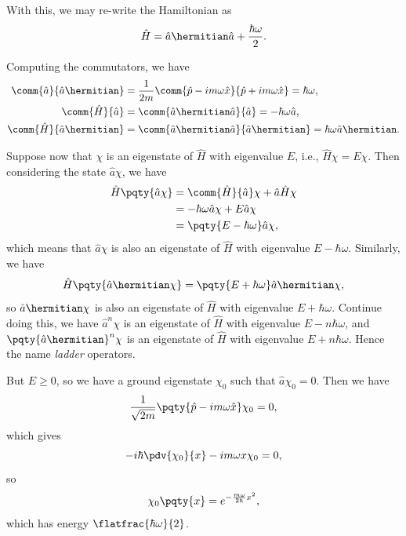 With this, we may re-write the Hamiltonian as
\begin{equation}
    \hat{H} = \hat{a}\hermitian \hat{a} + \frac{\hbar \omega}{2}.
\end{equation}

Computing the commutators, we have
\begin{subequations}
    \begin{align}
        \comm{\hat{a}}{\hat{a}\hermitian} &= \frac{1}{2m} \comm{\hat{p} - i m \omega \hat{x}}{\hat{p} + i m \omega \hat{x}}  = \hbar \omega, \\
        \comm{\hat{H}}{\hat{a}} &= \comm{\hat{a}\hermitian \hat{a}}{\hat{a}} = - \hbar \omega \hat{a}, \\
        \comm{\hat{H}}{\hat{a}\hermitian} &= \comm{\hat{a}\hermitian \hat{a}}{\hat{a}\hermitian} = \hbar \omega \hat{a}\hermitian.
    \end{align}
\end{subequations}

Suppose now that \(\chi\) is an eigenstate of \(\hat{H}\) with eigenvalue \(E\), i.e., \(\hat{H} \chi = E \chi\). Then considering the state \(\hat{a} \chi\), we have
\begin{subequations}
    \begin{align}
        \hat{H} \pqty{\hat{a} \chi} &= \comm{\hat{H}}{\hat{a}} \chi + \hat{a} \hat{H} \chi \\
        &= - \hbar \omega \hat{a} \chi + E \hat{a} \chi \\
        &= \pqty{E - \hbar \omega} \hat{a} \chi,
    \end{align}
\end{subequations}
which means that \(\hat{a} \chi\) is also an eigenstate of \(\hat{H}\) with eigenvalue \(E - \hbar \omega\). Similarly, we have
\begin{equation}
    \hat{H} \pqty{\hat{a}\hermitian \chi} = \pqty{E + \hbar \omega} \hat{a}\hermitian \chi,
\end{equation}
so \(\hat{a}\hermitian \chi\) is also an eigenstate of \(\hat{H}\) with eigenvalue \(E + \hbar \omega\). Continue doing this, we have \(\hat{a}^n \chi\) is an eigenstate of \(\hat{H}\) with eigenvalue \(E - n \hbar \omega\), and \(\pqty{\hat{a}\hermitian}^n \chi\) is an eigenstate of \(\hat{H}\) with eigenvalue \(E + n \hbar \omega\). Hence the name \emph{ladder} operators.

But \(E \geq 0\), so we have a ground eigenstate \(\chi_0\) such that \(\hat{a} \chi_0 = 0\). Then we have
\begin{equation}
    \frac{1}{\sqrt{2m}} \pqty{\hat{p} - i m \omega \hat{x}} \chi_0 = 0,
\end{equation}
which gives
\begin{equation}
    - i \hbar \pdv{\chi_0}{x} - i m \omega x \chi_0 = 0,
\end{equation}
so
\begin{equation}
    \chi_0 \pqty{x} = e^{- \frac{m \omega}{2 \hbar} x^2},
\end{equation}
which has energy \(\flatfrac{\hbar \omega}{2}\).

